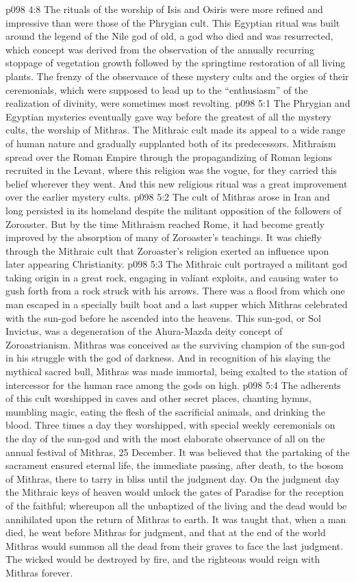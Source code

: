 \vs p098 4:8 The rituals of the worship of Isis and Osiris were more refined and impressive than were those of the Phrygian cult. This Egyptian ritual was built around the legend of the Nile god of old, a god who died and was resurrected, which concept was derived from the observation of the annually recurring stoppage of vegetation growth followed by the springtime restoration of all living plants. The frenzy of the observance of these mystery cults and the orgies of their ceremonials, which were supposed to lead up to the “enthusiasm” of the realization of divinity, were sometimes most revolting.
\vs p098 5:1 The Phrygian and Egyptian mysteries eventually gave way before the greatest of all the mystery cults, the worship of Mithras. The Mithraic cult made its appeal to a wide range of human nature and gradually supplanted both of its predecessors. Mithraism spread over the Roman Empire through the propagandizing of Roman legions recruited in the Levant, where this religion was the vogue, for they carried this belief wherever they went. And this new religious ritual was a great improvement over the earlier mystery cults.
\vs p098 5:2 The cult of Mithras arose in Iran and long persisted in its homeland despite the militant opposition of the followers of Zoroaster. But by the time Mithraism reached Rome, it had become greatly improved by the absorption of many of Zoroaster’s teachings. It was chiefly through the Mithraic cult that Zoroaster’s religion exerted an influence upon later appearing Christianity.
\vs p098 5:3 \pc The Mithraic cult portrayed a militant god taking origin in a great rock, engaging in valiant exploits, and causing water to gush forth from a rock struck with his arrows. There was a flood from which one man escaped in a specially built boat and a last supper which Mithras celebrated with the sun\hyp{}god before he ascended into the heavens. This sun\hyp{}god, or Sol Invictus, was a degeneration of the Ahura\hyp{}Mazda deity concept of Zoroastrianism. Mithras was conceived as the surviving champion of the sun\hyp{}god in his struggle with the god of darkness. And in recognition of his slaying the mythical sacred bull, Mithras was made immortal, being exalted to the station of intercessor for the human race among the gods on high.
\vs p098 5:4 The adherents of this cult worshipped in caves and other secret places, chanting hymns, mumbling magic, eating the flesh of the sacrificial animals, and drinking the blood. Three times a day they worshipped, with special weekly ceremonials on the day of the sun\hyp{}god and with the most elaborate observance of all on the annual festival of Mithras, 25 December. It was believed that the partaking of the sacrament ensured eternal life, the immediate passing, after death, to the bosom of Mithras, there to tarry in bliss until the judgment day. On the judgment day the Mithraic keys of heaven would unlock the gates of Paradise for the reception of the faithful; whereupon all the unbaptized of the living and the dead would be annihilated upon the return of Mithras to earth. It was taught that, when a man died, he went before Mithras for judgment, and that at the end of the world Mithras would summon all the dead from their graves to face the last judgment. The wicked would be destroyed by fire, and the righteous would reign with Mithras forever.

